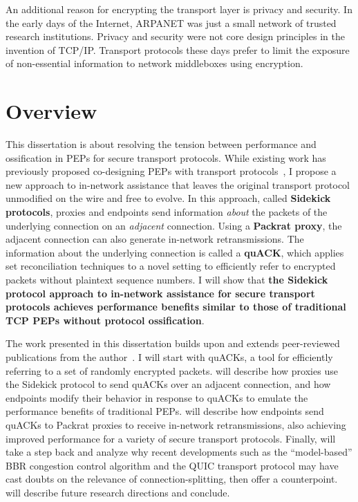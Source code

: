 An additional reason for encrypting the transport layer is privacy and security.
In the early days of the Internet, ARPANET was just a small network of trusted
research institutions. Privacy and security were not core design principles in
the invention of TCP/IP. Transport protocols these days prefer to limit the
exposure of non-essential information to network middleboxes using encryption.

\section{Overview}

This dissertation is about resolving the tension between performance and
ossification in PEPs for secure transport protocols. While existing work has
previously proposed co-designing PEPs with transport protocols~\cite{ford2008logjam,sherry2015blindbox, dogar2012tapa,iyengar2009flow},
I propose a new
approach to in-network assistance that leaves the original transport protocol
unmodified on the wire and free to evolve. In this approach, called \textbf
{Sidekick protocols}, proxies and endpoints send information \textit{about} the
packets of the underlying connection on an \textit{adjacent} connection.
Using a \textbf{Packrat proxy}, the adjacent connection can also generate
in-network retransmissions.
The information about the underlying connection is called a \textbf
{quACK}, which applies set reconciliation techniques to a novel setting to
efficiently refer to encrypted packets without plaintext sequence numbers.
I will show that \textcolor{black!50!blue}{\textbf{the Sidekick protocol
approach to in-network assistance for secure transport protocols achieves
performance benefits similar to those of traditional TCP PEPs without protocol
ossification}}.

The work presented in this dissertation builds upon and extends peer-reviewed
publications from the author~\cite{yuan2022sidecar,yuan2024sidekick,yuan2025internet}.
I will start  with quACKs, a tool for efficiently
referring to a set of randomly encrypted packets.
 will describe how proxies use the Sidekick protocol to send
quACKs over an adjacent connection, and how endpoints modify their behavior in
response to quACKs to emulate the performance benefits of traditional PEPs.
 will describe how endpoints send quACKs to Packrat
proxies to receive in-network retransmissions, also achieving improved
performance for a variety of secure transport protocols.
Finally,  will take a step back and analyze why recent
developments such as the ``model-based'' BBR congestion control algorithm and
the QUIC transport protocol may have cast doubts on the relevance of
connection-splitting, then offer a counterpoint.
 will describe future research directions and conclude.

